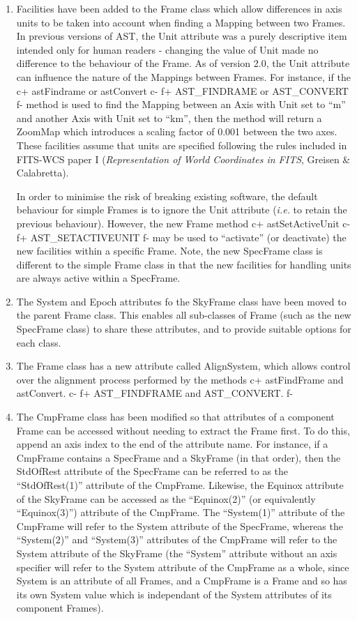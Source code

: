 \documentclass[twoside,11pt]{starlink}
\begin{document}
\begin{enumerate}
\item Facilities have been added to the Frame class which allow
differences in axis units to be taken into account when finding a Mapping
between two Frames. In previous versions of AST, the Unit attribute was a
purely descriptive item intended only for human readers - changing the
value of Unit made no difference to the behaviour of the Frame. As of
version 2.0, the Unit attribute can influence the nature of the Mappings
between Frames. For instance, if the
c+
astFindrame or astConvert
c-
f+
AST\_FINDRAME or AST\_CONVERT
f-
method is used to find the Mapping between an Axis with Unit set to ``m''
and another Axis with Unit set to ``km'', then the method will return a
ZoomMap which introduces a scaling factor of 0.001 between the two axes.
These facilities assume that units are specified following the rules
included in FITS-WCS paper I (\emph{Representation of World
Coordinates in FITS}, Greisen \& Calabretta).

In order to minimise the risk of breaking existing software, the default
behaviour for simple Frames is to ignore the Unit attribute (\emph{i.e.}
to retain the previous behaviour). However, the new Frame method
c+
astSetActiveUnit
c-
f+
AST\_SETACTIVEUNIT
f-
may be used to ``activate'' (or deactivate) the new facilities within a
specific Frame. Note, the new SpecFrame class is different to the simple
Frame class in that the new facilities for handling units are always active
within a SpecFrame.

\item The System and Epoch attributes fo the SkyFrame class have been
moved to the parent Frame class. This enables all sub-classes of Frame
(such as the new SpecFrame class) to share these attributes, and to provide
suitable options for each class.

\item The Frame class has a new attribute called AlignSystem, which allows
control over the alignment process performed by the methods
c+
astFindFrame and astConvert.
c-
f+
AST\_FINDFRAME and AST\_CONVERT.
f-


\item The CmpFrame class has been modified so that attributes of a
component Frame can be accessed without needing to extract the Frame first.
To do this, append an axis index to the end of the attribute name. For
instance, if a CmpFrame contains a SpecFrame and a SkyFrame (in that order),
then the StdOfRest attribute of the SpecFrame can be referred to as the
``StdOfRest(1)'' attribute of the CmpFrame. Likewise, the Equinox attribute
of the SkyFrame can be accessed as the ``Equinox(2)'' (or equivalently
``Equinox(3)'') attribute of the CmpFrame. The ``System(1)'' attribute of the
CmpFrame will refer to the System attribute of the SpecFrame, whereas the
``System(2)'' and ``System(3)'' attributes of the CmpFrame will refer to the
System attribute of the SkyFrame (the ``System'' attribute without an axis
specifier will refer to the System attribute of the CmpFrame as a whole,
since System is an attribute of all Frames, and a CmpFrame is a Frame and
so has its own System value which is independant of the System attributes
of its component Frames).


\end{enumerate}
\end{document}
